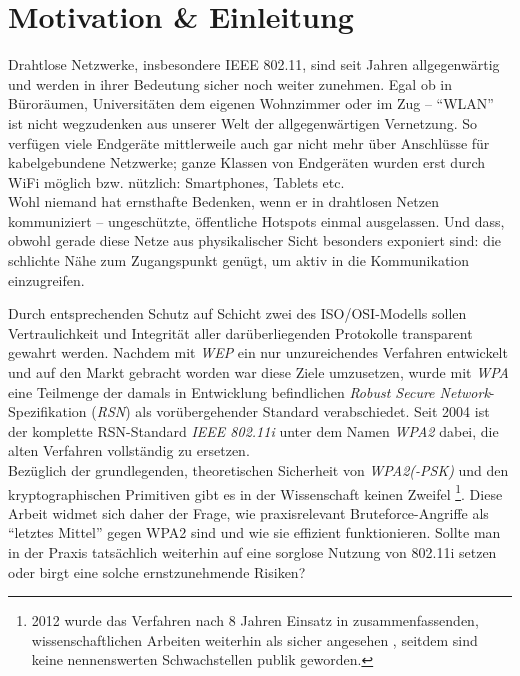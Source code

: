 \section{Motivation \& Einleitung}
Drahtlose Netzwerke, insbesondere IEEE 802.11, sind seit Jahren allgegenwärtig und werden in ihrer Bedeutung sicher noch weiter zunehmen. Egal ob in Büroräumen, Universitäten dem eigenen Wohnzimmer oder im Zug -- \enquote{WLAN} ist nicht wegzudenken aus unserer Welt der allgegenwärtigen Vernetzung. 
So verfügen viele Endgeräte mittlerweile auch gar nicht mehr über Anschlüsse für kabelgebundene Netzwerke; ganze Klassen von Endgeräten wurden erst durch WiFi möglich bzw. nützlich: Smartphones, Tablets etc.\\

Wohl niemand hat ernsthafte Bedenken, wenn er in drahtlosen Netzen kommuniziert -- ungeschützte, öffentliche Hotspots einmal ausgelassen. 
Und dass, obwohl gerade diese Netze aus physikalischer Sicht besonders exponiert sind: die schlichte Nähe zum Zugangspunkt genügt, um aktiv in die Kommunikation einzugreifen.

Durch entsprechenden Schutz auf Schicht zwei des ISO/OSI-Modells sollen Vertraulichkeit und Integrität aller darüberliegenden Protokolle transparent gewahrt werden.
Nachdem mit \textit{WEP} ein nur unzureichendes Verfahren entwickelt und auf den Markt gebracht worden war diese Ziele umzusetzen, wurde mit \textit{WPA} eine Teilmenge der damals in Entwicklung befindlichen \textit{Robust Secure Network}-Spezifikation (\textit{RSN}) als vorübergehender Standard verabschiedet. 
Seit 2004 ist der komplette RSN-Standard \textit{IEEE 802.11i} unter dem Namen \textit{WPA2} dabei, die alten Verfahren vollständig zu ersetzen.\\

Bezüglich der grundlegenden, theoretischen Sicherheit von \textit{WPA2(-PSK)} und den kryptographischen Primitiven gibt es in der Wissenschaft keinen Zweifel \footnote{2012 wurde das Verfahren nach 8 Jahren Einsatz in zusammenfassenden, wissenschaftlichen Arbeiten weiterhin als sicher angesehen \cite{kumkar2012}, seitdem sind keine nennenswerten Schwachstellen publik geworden.}. %
Diese Arbeit widmet sich daher der Frage, wie praxisrelevant Bruteforce-Angriffe als \enquote{letztes Mittel} gegen WPA2 sind und wie sie effizient funktionieren.
Sollte man in der Praxis tatsächlich weiterhin auf eine sorglose Nutzung von 802.11i setzen oder birgt eine solche ernstzunehmende Risiken?\\

